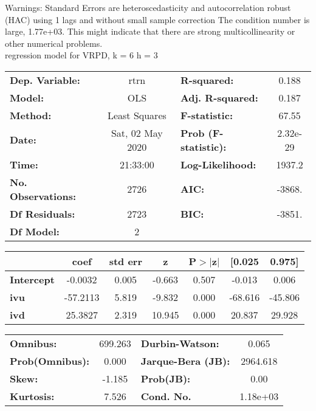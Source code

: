 Warnings: \newline
 [1] Standard Errors are heteroscedasticity and autocorrelation robust (HAC) using 1 lags and without small sample correction \newline
 [2] The condition number is large, 1.77e+03. This might indicate that there are \newline
 strong multicollinearity or other numerical problems.\\ 

regression model for VRPD, k = 6 h = 3\begin{center}
\begin{tabular}{lclc}
\toprule
\textbf{Dep. Variable:}    &       rtrn       & \textbf{  R-squared:         } &     0.188   \\
\textbf{Model:}            &       OLS        & \textbf{  Adj. R-squared:    } &     0.187   \\
\textbf{Method:}           &  Least Squares   & \textbf{  F-statistic:       } &     67.55   \\
\textbf{Date:}             & Sat, 02 May 2020 & \textbf{  Prob (F-statistic):} &  2.32e-29   \\
\textbf{Time:}             &     21:33:00     & \textbf{  Log-Likelihood:    } &    1937.2   \\
\textbf{No. Observations:} &        2726      & \textbf{  AIC:               } &    -3868.   \\
\textbf{Df Residuals:}     &        2723      & \textbf{  BIC:               } &    -3851.   \\
\textbf{Df Model:}         &           2      & \textbf{                     } &             \\
\bottomrule
\end{tabular}
\begin{tabular}{lcccccc}
                   & \textbf{coef} & \textbf{std err} & \textbf{z} & \textbf{P$> |$z$|$} & \textbf{[0.025} & \textbf{0.975]}  \\
\midrule
\textbf{Intercept} &      -0.0032  &        0.005     &    -0.663  &         0.507        &       -0.013    &        0.006     \\
\textbf{ivu}       &     -57.2113  &        5.819     &    -9.832  &         0.000        &      -68.616    &      -45.806     \\
\textbf{ivd}       &      25.3827  &        2.319     &    10.945  &         0.000        &       20.837    &       29.928     \\
\bottomrule
\end{tabular}
\begin{tabular}{lclc}
\textbf{Omnibus:}       & 699.263 & \textbf{  Durbin-Watson:     } &    0.065  \\
\textbf{Prob(Omnibus):} &   0.000 & \textbf{  Jarque-Bera (JB):  } & 2964.618  \\
\textbf{Skew:}          &  -1.185 & \textbf{  Prob(JB):          } &     0.00  \\
\textbf{Kurtosis:}      &   7.526 & \textbf{  Cond. No.          } & 1.18e+03  \\
\bottomrule
\end{tabular}
\end{center}

